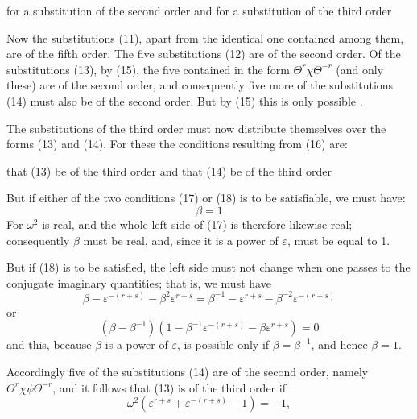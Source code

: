 
for a substitution of the second order
and for a substitution of the third order

Now the substitutions (11), apart from the identical one contained among them, are of the fifth order. The five substitutions (12) are of the second order. Of the substitutions (13), by (15), the five contained in the form $\Theta^r\chi\Theta^{-r}$ (and only these) are of the second order, and consequently five more of the substitutions (14) must also be of the second order. But by (15) this is only possible .

The substitutions of the third order must now distribute themselves over the forms (13) and (14). For these the conditions resulting from (16) are:

that (13) be of the third order
and that (14) be of the third order

But if either of the two conditions (17) or (18) is to be satisfiable, we must have:
\[
\beta = 1
\]
For $\omega^2$ is real, and the whole left side of (17) is therefore likewise real; consequently $\beta$ must be real, and, since it is a power of $\varepsilon$, must be equal to 1.

But if (18) is to be satisfied, the left side must not change when one passes to the conjugate imaginary quantities; that is, we must have
\[
\beta - \varepsilon^{-(r+s)} - \beta^2\varepsilon^{r+s} = \beta^{-1} - \varepsilon^{r+s} - \beta^{-2}\varepsilon^{-(r+s)}
\]
or
\[
(\beta - \beta^{-1})(1 - \beta^{-1}\varepsilon^{-(r+s)} - \beta\varepsilon^{r+s}) = 0
\]
and this, because $\beta$ is a power of $\varepsilon$, is possible only if $\beta = \beta^{-1}$, and hence $\beta = 1$.

Accordingly five of the substitutions (14) are of the second order, namely $\Theta^r\chi\psi\Theta^{-r}$, and it follows that (13) is of the third order if
\[
\omega^2(\varepsilon^{r+s} + \varepsilon^{-(r+s)} - 1) = -1,
\]
